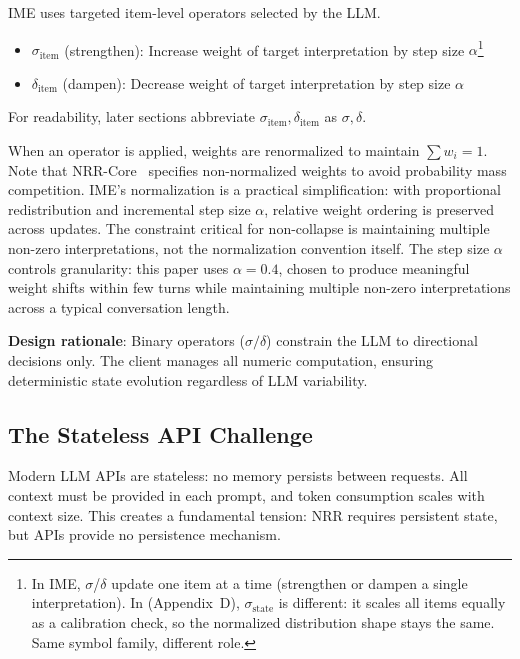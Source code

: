 \documentclass[11pt,a4paper]{article}
\begin{document}
IME uses targeted item-level operators selected by the LLM.

\begin{itemize}
    \item $\sigma_{\text{item}}$ (strengthen): Increase weight of target interpretation by step
    size $\alpha$\footnote{In IME, $\sigma$/$\delta$ update one item at a time (strengthen or dampen a single interpretation). In \cite{saito2026phi} (Appendix~D), $\sigma_{\mathrm{state}}$ is different: it scales all items equally as a calibration check, so the normalized distribution shape stays the same. Same symbol family, different role.}
    \item $\delta_{\text{item}}$ (dampen): Decrease weight of target interpretation by step
          size $\alpha$
\end{itemize}

For readability, later sections abbreviate $\sigma_{\text{item}}, \delta_{\text{item}}$ as $\sigma, \delta$.

When an operator is applied, weights are renormalized to maintain $\sum w_i = 1$.
Note that NRR-Core~\cite{saito2025nrr} specifies non-normalized weights to avoid
probability mass competition. IME's normalization is a practical simplification:
with proportional redistribution and incremental step size $\alpha$, relative
weight ordering is preserved across updates. The constraint critical for
non-collapse is maintaining multiple non-zero interpretations, not the
normalization convention itself.
The step size $\alpha$ controls granularity: this paper uses $\alpha = 0.4$,
chosen to produce meaningful weight shifts within few turns while maintaining
multiple non-zero interpretations across a typical conversation length.

\textbf{Design rationale}: Binary operators ($\sigma/\delta$) constrain the LLM to
directional decisions only. The client manages all numeric computation, ensuring
deterministic state evolution regardless of LLM variability.

\subsection{The Stateless API Challenge}

Modern LLM APIs are stateless: no memory persists between requests. All context
must be provided in each prompt, and token consumption scales with context size.
This creates a fundamental tension: NRR requires persistent state, but APIs provide
no persistence mechanism.
\end{document}
